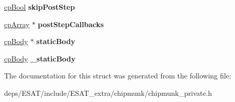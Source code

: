 \begin{DoxyCompactItemize}
\mbox{\hyperlink{group__basic_types_gabc5e752c48f3449ca26ef413ecbd647e}{cp\+Bool}} {\bfseries skip\+Post\+Step}
\item 
\mbox{\label{structcp_space_a0d0ff9535b8383c8d09c90eee4ae02a6}} 
\mbox{\hyperlink{structcp_array}{cp\+Array}} $\ast$ {\bfseries post\+Step\+Callbacks}
\item 
\mbox{\label{structcp_space_aa7cb4add8933036493bf7f4ee98ad13e}} 
\mbox{\hyperlink{structcp_body}{cp\+Body}} $\ast$ {\bfseries static\+Body}
\item 
\mbox{\label{structcp_space_a9ef6a6fa6948d39ec8075af0daa452cd}} 
\mbox{\hyperlink{structcp_body}{cp\+Body}} {\bfseries \+\_\+static\+Body}
\end{DoxyCompactItemize}


The documentation for this struct was generated from the following file\+:\begin{DoxyCompactItemize}
\item 
deps/\+E\+S\+A\+T/include/\+E\+S\+A\+T\+\_\+extra/chipmunk/chipmunk\+\_\+private.\+h\end{DoxyCompactItemize}
